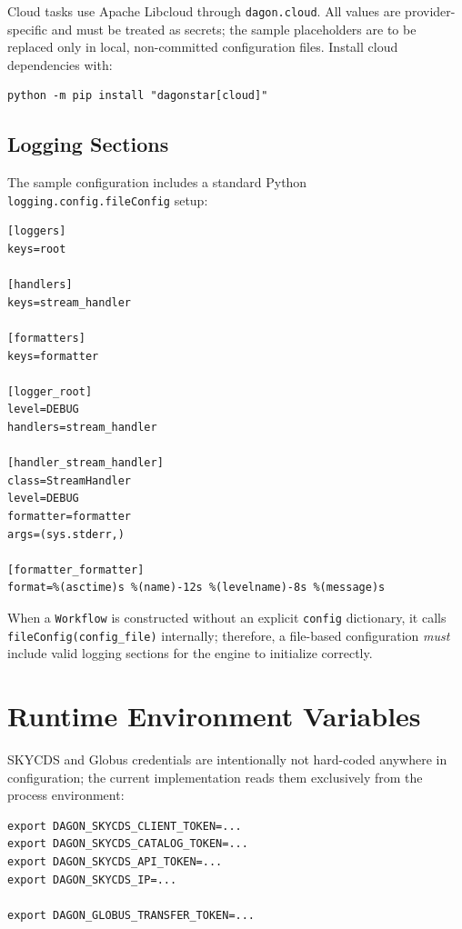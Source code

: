 Cloud tasks use Apache Libcloud through \texttt{dagon.cloud}. All values are
provider-specific and must be treated as secrets; the sample placeholders are
to be replaced only in local, non-committed configuration files. Install
cloud dependencies with:

\begin{lstlisting}[style=bash]
python -m pip install "dagonstar[cloud]"
\end{lstlisting}

\subsection{Logging Sections}

The sample configuration includes a standard Python
\texttt{logging.config.fileConfig} setup:

\begin{lstlisting}[style=ini]
[loggers]
keys=root

[handlers]
keys=stream_handler

[formatters]
keys=formatter

[logger_root]
level=DEBUG
handlers=stream_handler

[handler_stream_handler]
class=StreamHandler
level=DEBUG
formatter=formatter
args=(sys.stderr,)

[formatter_formatter]
format=%(asctime)s %(name)-12s %(levelname)-8s %(message)s
\end{lstlisting}

When a \texttt{Workflow} is constructed without an explicit \texttt{config}
dictionary, it calls \texttt{fileConfig(config\_file)} internally; therefore,
a file-based configuration \emph{must} include valid logging sections for the
engine to initialize correctly.

\section{Runtime Environment Variables}

SKYCDS and Globus credentials are intentionally not hard-coded anywhere in
configuration; the current implementation reads them exclusively from the
process environment:

\begin{lstlisting}[style=bash]
export DAGON_SKYCDS_CLIENT_TOKEN=...
export DAGON_SKYCDS_CATALOG_TOKEN=...
export DAGON_SKYCDS_API_TOKEN=...
export DAGON_SKYCDS_IP=...

export DAGON_GLOBUS_TRANSFER_TOKEN=...
\end{lstlisting}

